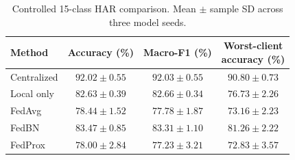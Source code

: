 \begin{table}[t]
\centering
\caption{Controlled 15-class HAR comparison. Mean $\pm$ sample SD across three model seeds.}
\label{tab:har_fl_controlled}
\footnotesize
\setlength{\tabcolsep}{3pt}
\begin{tabular}{@{}lccc@{}}
\toprule
Method & Accuracy (\%) & Macro-F1 (\%) & \shortstack{Worst-client\\accuracy (\%)} \\
\midrule
Centralized & $92.02 \pm 0.55$ & $92.03 \pm 0.55$ & $90.80 \pm 0.73$ \\
Local only & $82.63 \pm 0.39$ & $82.66 \pm 0.34$ & $76.73 \pm 2.26$ \\
FedAvg & $78.44 \pm 1.52$ & $77.78 \pm 1.87$ & $73.16 \pm 2.23$ \\
FedBN & $83.47 \pm 0.85$ & $83.31 \pm 1.10$ & $81.26 \pm 2.22$ \\
FedProx & $78.00 \pm 2.84$ & $77.23 \pm 3.21$ & $72.83 \pm 3.57$ \\
\bottomrule
\end{tabular}
\end{table}
